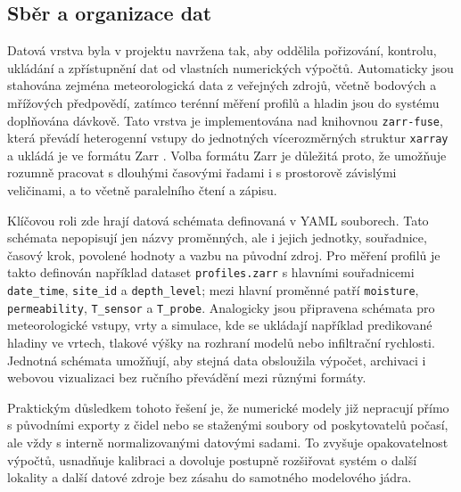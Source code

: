 \documentclass[11pt,a4paper]{article}
\begin{document}
\begin{onehalfspacing}


\subsection{Sběr a organizace dat}
Datová vrstva byla v projektu navržena tak, aby oddělila pořizování,
kontrolu, ukládání a zpřístupnění dat od vlastních numerických výpočtů.
Automaticky jsou stahována zejména meteorologická data z veřejných zdrojů,
včetně bodových a mřížových předpovědí, zatímco terénní měření profilů a
hladin jsou do systému doplňována dávkově. Tato vrstva je implementována nad
knihovnou \texttt{zarr-fuse}, která převádí heterogenní vstupy do jednotných
vícerozměrných struktur \texttt{xarray} a ukládá je ve formátu Zarr
\parencite{Xarray_HoyerHamman2017,ZarrPython_Zenodo2025,HLAVO_GitHub}. Volba formátu
Zarr je důležitá proto, že umožňuje rozumně pracovat s dlouhými časovými řadami
i s prostorově závislými veličinami, a to včetně paralelního čtení a zápisu.

Klíčovou roli zde hrají datová schémata definovaná v YAML souborech. Tato
schémata nepopisují jen názvy proměnných, ale i jejich jednotky, souřadnice,
časový krok, povolené hodnoty a vazbu na původní zdroj. Pro měření profilů je
takto definován například dataset \texttt{profiles.zarr} s hlavními souřadnicemi
\texttt{date\_time}, \texttt{site\_id} a \texttt{depth\_level}; mezi hlavní
proměnné patří \texttt{moisture}, \texttt{permeability}, \texttt{T\_sensor} a
\texttt{T\_probe}. Analogicky jsou připravena schémata pro meteorologické
vstupy, vrty a simulace, kde se ukládají například predikované hladiny ve
vrtech, tlakové výšky na rozhraní modelů nebo infiltrační rychlosti. Jednotná
schémata umožňují, aby stejná data obsloužila výpočet, archivaci i webovou
vizualizaci bez ručního převádění mezi různými formáty.

Praktickým důsledkem tohoto řešení je, že numerické modely již nepracují přímo
s původními exporty z čidel nebo se staženými soubory od poskytovatelů počasí,
ale vždy s interně normalizovanými datovými sadami. To zvyšuje opakovatelnost
výpočtů, usnadňuje kalibraci a dovoluje postupně rozšiřovat systém o další
lokality a další datové zdroje bez zásahu do samotného modelového jádra.


\end{onehalfspacing}
\end{document}
